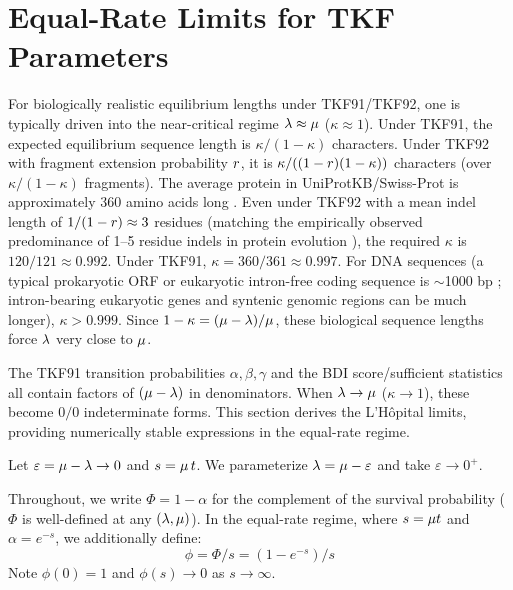 
\section{Equal-Rate Limits for TKF Parameters}
\label{sec:lhopital}

For biologically realistic equilibrium lengths under TKF91/TKF92, one is typically driven into the near-critical regime
$\lambda \approx \mu$ ($\kappa \approx 1$).
Under TKF91, the expected equilibrium sequence length is
$\kappa/(1-\kappa)$ characters.
Under TKF92 with fragment extension probability $r$,
it is $\kappa/((1-r)(1-\kappa))$ characters (over $\kappa/(1-\kappa)$ fragments).
The average protein in UniProtKB/Swiss-Prot is approximately
360 amino acids long \cite{UniProtStatistics}.
Even under TKF92 with a mean indel length of $1/(1-r) \approx 3$
residues (matching the empirically observed predominance of
1--5 residue indels in protein evolution \cite{Cartwright2009,Ajawatanawong2013}),
the required $\kappa$ is $120/121 \approx 0.992$.
Under TKF91, $\kappa = 360/361 \approx 0.997$.
For DNA sequences (a typical prokaryotic ORF or eukaryotic
intron-free coding sequence is $\sim$1000 bp
\cite{XuEtAl2006}; intron-bearing eukaryotic genes and syntenic
genomic regions can be much longer), $\kappa > 0.999$.
Since $1 - \kappa = (\mu - \lambda)/\mu$, these
biological sequence lengths force $\lambda$ very close to $\mu$.

The TKF91 transition probabilities $\alpha, \beta, \gamma$ and the
BDI score/sufficient statistics all contain factors of
$(\mu - \lambda)$ in denominators.
When $\lambda \to \mu$ ($\kappa \to 1$),
these become $0/0$ indeterminate forms.
This section derives the L'H\^opital limits, providing
numerically stable expressions in the equal-rate regime.

Let $\varepsilon = \mu - \lambda \to 0$ and $s = \mu\,t$.
We parameterize $\lambda = \mu - \varepsilon$ and take
$\varepsilon \to 0^+$.

Throughout, we write $\Phi = 1 - \alpha$ for the complement of the
survival probability ($\Phi$ is well-defined at any $(\lambda,\mu)$).
In the equal-rate regime, where $s = \mu t$ and $\alpha = e^{-s}$,
we additionally define:
\[
\phi = \Phi/s = (1-e^{-s})/s
\]
Note $\phi(0) = 1$ and $\phi(s) \to 0$ as $s \to \infty$.

